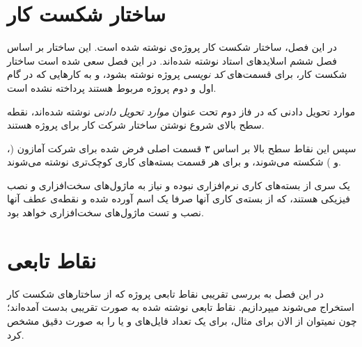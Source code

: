 \chapter{ساختار شکست کار}\label{chap:wbs}
در این فصل، ساختار شکست کار پروژه‌ی
نوشته شده است. این ساختار بر اساس فصل ششم اسلاید‌های استاد نوشته شده‌اند. در این فصل سعی شده است ساختار شکست کار، برای قسمت‌های \textit{کد نویسی} پروژه نوشته بشود، و به کارهایی که در گام اول و دوم پروژه مربوط هستند پرداخته نشده ‌است.

موارد تحویل دادنی که در فاز دوم تحت عنوان \textit{موارد تحویل دادنی} نوشته شده‌اند، نقطه سطح بالای شروع نوشتن ساختار شرکت کار برای پروژه 
هستند.

سپس این نقاط سطح بالا بر اساس ۳ قسمت اصلی فرض شده برای شرکت آمازون (،  و ) شکسته می‌شوند، و برای هر قسمت بسته‌های کاری کوچک‌تری نوشته می‌شوند.

یک سری از بسته‌های کاری نرم‌افزاری نبوده و نیاز به ماژول‌های سخت‌افزاری و نصب فیزیکی هستند، که از بسته‌ی کاری آنها صرفا یک اسم آورده شده و نقطه‌ی عطف آنها نصب و تست ماژول‌‌های سخت‌افزاری خواهد بود.





\chapter{نقاط تابعی}
در این فصل به بررسی تقریبی نقاط تابعی پروژه که از ساختار‌های شکست کار استخراج می‌شوند  میپردازیم. نقاط تابعی نوشته شده به صورت تقریبی بدست آمده‌اند؛ چون نمیتوان از الان برای مثال،‌ برای یک 
تعداد فایل‌های 
و یا 
را به صورت دقیق مشخص کرد.
\newpage
